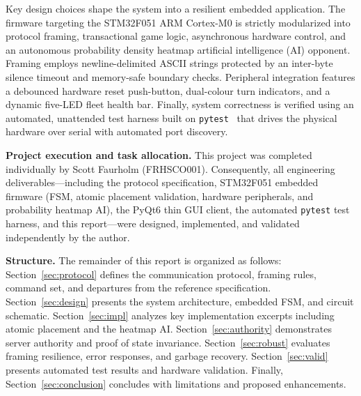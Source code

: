 Key design choices shape the system into a resilient embedded application. The firmware targeting the STM32F051 ARM Cortex-M0 is strictly modularized into protocol framing, transactional game logic, asynchronous hardware control, and an autonomous probability density heatmap artificial intelligence (AI) opponent. Framing employs newline-delimited ASCII strings protected by an inter-byte silence timeout and memory-safe boundary checks. Peripheral integration features a debounced hardware reset push-button, dual-colour turn indicators, and a dynamic five-LED fleet health bar. Finally, system correctness is verified using an automated, unattended test harness built on \texttt{pytest}~\cite{pytest} that drives the physical hardware over serial with automated port discovery.

\textbf{Project execution and task allocation.} This project was completed individually by Scott Faurholm (FRHSCO001). Consequently, all engineering deliverables---including the protocol specification, STM32F051 embedded firmware (FSM, atomic placement validation, hardware peripherals, and probability heatmap AI), the PyQt6 thin GUI client, the automated \texttt{pytest} test harness, and this report---were designed, implemented, and validated independently by the author.

\textbf{Structure.} The remainder of this report is organized as follows: Section~\ref{sec:protocol} defines the communication protocol, framing rules, command set, and departures from the reference specification. Section~\ref{sec:design} presents the system architecture, embedded FSM, and circuit schematic. Section~\ref{sec:impl} analyzes key implementation excerpts including atomic placement and the heatmap AI. Section~\ref{sec:authority} demonstrates server authority and proof of state invariance. Section~\ref{sec:robust} evaluates framing resilience, error responses, and garbage recovery. Section~\ref{sec:valid} presents automated test results and hardware validation. Finally, Section~\ref{sec:conclusion} concludes with limitations and proposed enhancements.
